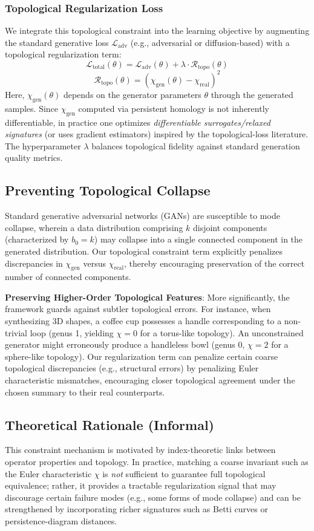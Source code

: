 \documentclass[10pt,leqno]{amsart}
\begin{document}
\subsubsection{Topological Regularization Loss}
We integrate this topological constraint into the learning objective by augmenting the standard generative loss $\mathcal{L}_{\text{adv}}$ (e.g., adversarial or diffusion-based) with a topological regularization term:
\[
\mathcal{L}_{\text{total}}(\theta) = \mathcal{L}_{\text{adv}}(\theta) + \lambda \cdot \mathcal{R}_{\text{topo}}(\theta)
\]
\[
\mathcal{R}_{\text{topo}}(\theta) = \left( \chi_{\text{gen}}(\theta) - \chi_{\text{real}} \right)^2
\]
Here, $\chi_{\text{gen}}(\theta)$ depends on the generator parameters $\theta$ through the generated samples. Since $\chi_{\text{gen}}$ computed via persistent homology is not inherently differentiable, in practice one optimizes \emph{differentiable surrogates/relaxed signatures} (or uses gradient estimators) inspired by the topological-loss literature. The hyperparameter $\lambda$ balances topological fidelity against standard generation quality metrics.

\subsection{Preventing Topological Collapse}
Standard generative adversarial networks (GANs) are susceptible to mode collapse, wherein a data distribution comprising $k$ disjoint components (characterized by $b_0 = k$) may collapse into a single connected component in the generated distribution. Our topological constraint term explicitly penalizes discrepancies in $\chi_{\text{gen}}$ versus $\chi_{\text{real}}$, thereby encouraging preservation of the correct number of connected components.

\textbf{Preserving Higher-Order Topological Features}: More significantly, the framework guards against subtler topological errors. For instance, when synthesizing 3D shapes, a coffee cup possesses a handle corresponding to a non-trivial loop (genus 1, yielding $\chi=0$ for a torus-like topology). An unconstrained generator might erroneously produce a handleless bowl (genus 0, $\chi=2$ for a sphere-like topology). Our regularization term can penalize certain coarse topological discrepancies (e.g., structural errors) by penalizing Euler characteristic mismatches, encouraging closer topological agreement under the chosen summary to their real counterparts.

\subsection{Theoretical Rationale (Informal)}
This constraint mechanism is motivated by index-theoretic links between operator properties and topology. In practice, matching a coarse invariant such as the Euler characteristic $\chi$ is \emph{not} sufficient to guarantee full topological equivalence; rather, it provides a tractable regularization signal that may discourage certain failure modes (e.g., some forms of mode collapse) and can be strengthened by incorporating richer signatures such as Betti curves or persistence-diagram distances.
\end{document}
